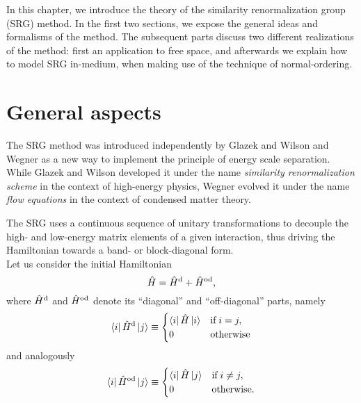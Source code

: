 \label{chap:SRG}
In this chapter, we introduce the theory of the similarity renormalization group (SRG) method.  In the first two sections, we expose the general ideas and formalisms of the method. The subsequent parts discuss two different realizations of the method: first an application to free space, and afterwards we explain how to model SRG in-medium, when making use of the technique of normal-ordering.


\section{General aspects}
The SRG method was introduced independently by Glazek and Wilson \cite{PhysRevD.48.5863,PhysRevD.49.4214} and Wegner \cite{PhysRepWegner0,PhysRepWegner} as a new way to implement the principle of energy scale separation. While Glazek and Wilson developed it under the name \textit{similarity renormalization scheme} in the context of high-energy physics, Wegner evolved it under the name \textit{flow equations} in the context of condensed matter theory.

The SRG uses a continuous sequence of unitary transformations to decouple the high- and low-energy matrix elements of a given interaction, thus driving the Hamiltonian towards a band- or block-diagonal form. \\
Let us consider the initial Hamiltonian
\[
 \hat{H} = \hat{H}^{\rm d} + \hat{H}^{\rm od},
\]
where $\hat{H}^{\rm d}$ and $\hat{H}^{\rm od}$ denote its  ``diagonal'' and ``off-diagonal'' parts, namely
\[
\left\langle i \right| \hat{H}^{\rm d} \left| j \right\rangle \equiv 
\begin{cases}
\left\langle i \right| \hat{H} \left| i \right\rangle &\text{if}\; i = j,\\
0 & \text{otherwise}
\end{cases}
\]
and analogously
\[
\left\langle i \right| \hat{H}^{\rm od} \left| j \right\rangle \equiv 
\begin{cases}
\left\langle i \right| \hat{H} \left| j \right\rangle &\text{if}\; i \neq j,\\
0 & \text{otherwise}.
\end{cases}
\]

